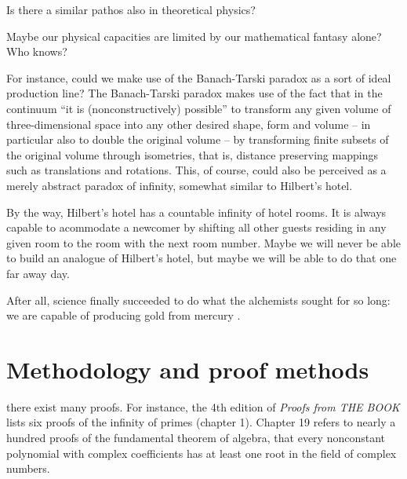 Is there a similar pathos also in theoretical physics?

Maybe our physical capacities are limited by our mathematical fantasy alone?
Who knows?

For instance, could we make use of the Banach-Tarski paradox \cite{springerlink:10.1007/BF03023740,wagon1}
as a sort of ideal production line?
The Banach-Tarski paradox makes use of the fact that in the continuum
``it is (nonconstructively) possible'' to transform any given volume of three-dimensional space into any other desired shape, form and volume
-- in particular also to double the original volume -- by
transforming finite subsets of the original volume
through isometries, that is, distance preserving mappings such as translations and rotations.
This, of course, could also be perceived as a merely abstract paradox of infinity, somewhat similar to Hilbert's hotel.

By the way,
Hilbert's hotel \cite{rucker} has a countable infinity of hotel rooms.
It is always capable to acommodate a newcomer by shifting all other guests residing in any given room
to the room with the next room number.
Maybe we will never be able to build an analogue of Hilbert's hotel, but maybe we will
be able to do that one far away day.

After all, science finally succeeded to do what the alchemists sought for so long:
we are capable of producing gold from mercury \cite{PhysRev.60.473}.

\begin{center}
{\color{lightgray}   \Huge
\aldine
}
\end{center}


\chapter{Methodology and proof methods}
\label{ch:mpm}

 there exist many proofs.
For instance, the 4th edition of {\em Proofs from THE BOOK}  \cite{ziegler-aigner}
lists six proofs
of the infinity of primes (chapter 1).
Chapter 19 refers to nearly a hundred proofs of the fundamental theorem
of algebra, that every nonconstant polynomial with complex coefficients has at least
one root in the field of complex numbers.

